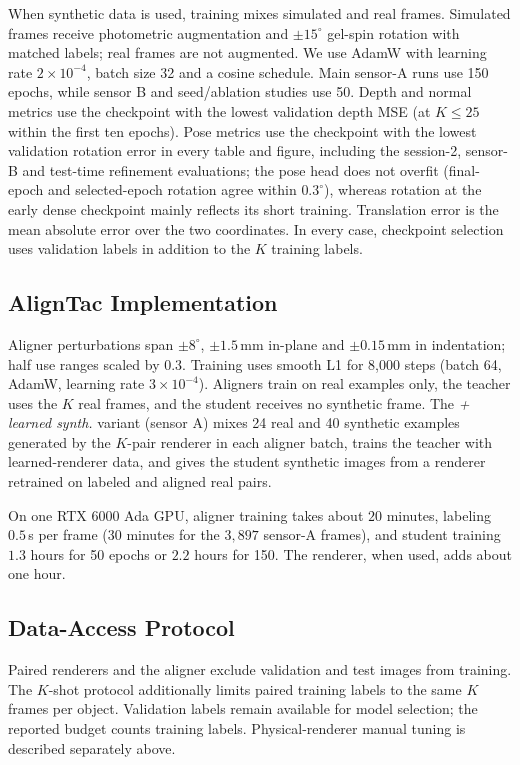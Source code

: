 When synthetic data is used, training mixes simulated and real frames. Simulated frames receive photometric augmentation and $\pm15^\circ$ gel-spin rotation with matched labels; real frames are not augmented. We use AdamW with learning rate $2\times10^{-4}$, batch size 32 and a cosine schedule. Main sensor-A runs use 150 epochs, while sensor B and seed/ablation studies use 50. Depth and normal metrics use the checkpoint with the lowest validation depth MSE (at $K\le25$ within the first ten epochs). Pose metrics use the checkpoint with the lowest validation rotation error in every table and figure, including the session-2, sensor-B and test-time refinement evaluations; the pose head does not overfit (final-epoch and selected-epoch rotation agree within $0.3^\circ$), whereas rotation at the early dense checkpoint mainly reflects its short training. Translation error is the mean absolute error over the two coordinates. In every case, checkpoint selection uses validation labels in addition to the $K$ training labels.

\subsection{AlignTac Implementation}
Aligner perturbations span $\pm8^\circ$, $\pm1.5\,$mm in-plane and $\pm0.15\,$mm in indentation; half use ranges scaled by $0.3$. Training uses smooth L1 for 8,000 steps (batch 64, AdamW, learning rate $3\times10^{-4}$). Aligners train on real examples only, the teacher uses the $K$ real frames, and the student receives no synthetic frame. The \emph{+ learned synth.} variant (sensor A) mixes 24 real and 40 synthetic examples generated by the $K$-pair renderer in each aligner batch, trains the teacher with learned-renderer data, and gives the student synthetic images from a renderer retrained on labeled and aligned real pairs.

On one RTX 6000 Ada GPU, aligner training takes about $20$ minutes, labeling $0.5\,$s per frame ($30$ minutes for the $3{,}897$ sensor-A frames), and student training $1.3$ hours for 50 epochs or $2.2$ hours for 150. The renderer, when used, adds about one hour.

\subsection{Data-Access Protocol}
\label{sec:protocol}
Paired renderers and the aligner exclude validation and test images from training. The $K$-shot protocol additionally limits paired training labels to the same $K$ frames per object. Validation labels remain available for model selection; the reported budget counts training labels. Physical-renderer manual tuning is described separately above.

